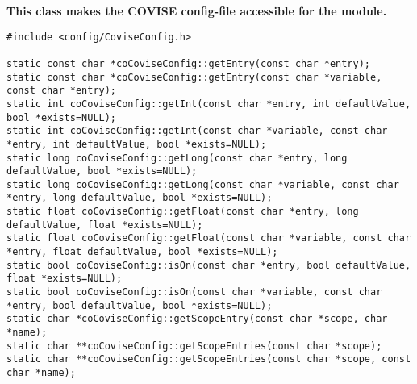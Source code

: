 {\bf This class makes the COVISE config-file accessible for the module.}

\begin{verbatim}
#include <config/CoviseConfig.h>

static const char *coCoviseConfig::getEntry(const char *entry);
static const char *coCoviseConfig::getEntry(const char *variable, const char *entry);
static int coCoviseConfig::getInt(const char *entry, int defaultValue, bool *exists=NULL);
static int coCoviseConfig::getInt(const char *variable, const char *entry, int defaultValue, bool *exists=NULL);
static long coCoviseConfig::getLong(const char *entry, long defaultValue, bool *exists=NULL);
static long coCoviseConfig::getLong(const char *variable, const char *entry, long defaultValue, bool *exists=NULL);
static float coCoviseConfig::getFloat(const char *entry, long defaultValue, float *exists=NULL);
static float coCoviseConfig::getFloat(const char *variable, const char *entry, float defaultValue, bool *exists=NULL);
static bool coCoviseConfig::isOn(const char *entry, bool defaultValue, float *exists=NULL);
static bool coCoviseConfig::isOn(const char *variable, const char *entry, bool defaultValue, bool *exists=NULL);
static char *coCoviseConfig::getScopeEntry(const char *scope, char *name);
static char **coCoviseConfig::getScopeEntries(const char *scope);
static char **coCoviseConfig::getScopeEntries(const char *scope, const char *name);
\end{verbatim}
